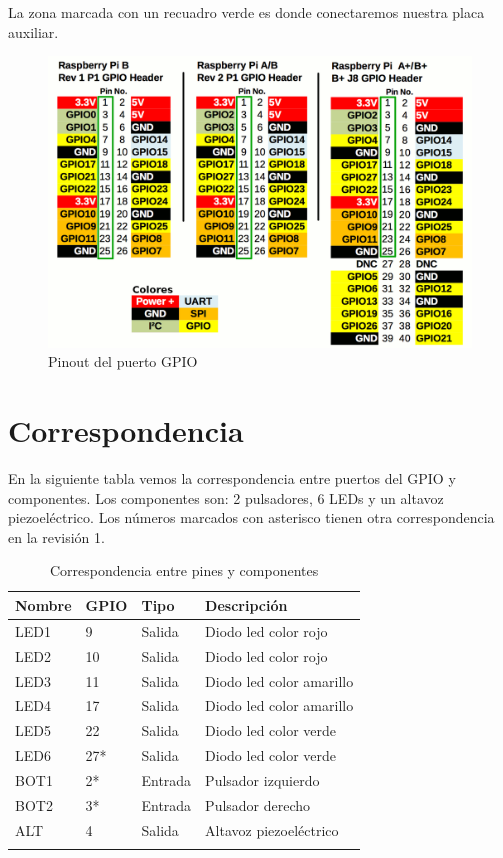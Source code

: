 La zona marcada con un recuadro verde es donde conectaremos nuestra placa auxiliar.

\begin{figure}[h]
  \centering
    \includegraphics[width=14cm]{graphs/RaspberryGPIO.png}
  \caption{Pinout del puerto GPIO}
  \label{fig:pinout}
\end{figure}

\section{Correspondencia}

En la siguiente tabla vemos la correspondencia entre puertos del GPIO y
componentes. Los componentes son: 2 pulsadores, 6 LEDs y un altavoz
piezoeléctrico. Los números marcados con asterisco tienen otra
correspondencia en la revisión 1.

\begin{longtable}{ p{1.8cm} | p{1.2cm} | p{2cm} | p{5cm}}
\hline
{\bf Nombre} & {\bf GPIO} & {\bf Tipo} & {\bf Descripción} \\ \hline
LED1 & 9 & Salida & Diodo led color rojo \\ \hline
LED2 & 10 & Salida & Diodo led color rojo \\ \hline
LED3 & 11 & Salida & Diodo led color amarillo \\ \hline
LED4 & 17 & Salida & Diodo led color amarillo \\ \hline
LED5 & 22 & Salida & Diodo led color verde \\ \hline
LED6 & 27* & Salida & Diodo led color verde \\ \hline
BOT1 & 2* & Entrada & Pulsador izquierdo \\ \hline
BOT2 & 3* & Entrada & Pulsador derecho \\ \hline
ALT & 4 & Salida & Altavoz piezoeléctrico \\ \hline
\caption{Correspondencia entre pines y componentes}
\label{tab:berry}
\end{longtable}

